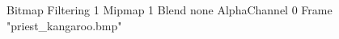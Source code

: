 {Bitmap
	{Filtering 1}
	{Mipmap 1}
	{Blend none}
	{AlphaChannel 0}
	{Frame "priest_kangaroo.bmp"}
}
